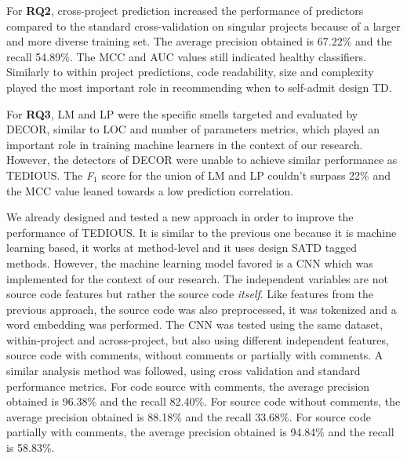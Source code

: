 For \textbf{RQ2}, cross-project prediction increased the performance of predictors compared to the standard cross-validation on singular projects because of a larger and more diverse training set. The average precision obtained is 67.22\% and the recall 54.89\%. The MCC and AUC values still indicated healthy classifiers. Similarly to within project predictions, code readability, size and complexity played the most important role in recommending when to self-admit design \ac{TD}. \par

For \textbf{RQ3}, \ac{LM} and \ac{LP} were the specific smells targeted and evaluated by \ac{DECOR}, similar to \ac{LOC} and number of parameters metrics, which played an important role in training machine learners in the context of our research. However, the detectors of \ac{DECOR} were unable to achieve similar performance as \ac{TEDIOUS}. The \emph{F$_{1}$} score for the union of \ac{LM} and \ac{LP} couldn't surpass 22\% and the \ac{MCC} value leaned towards a low prediction correlation. \par

We already designed and tested a new approach in order to improve the performance of \ac{TEDIOUS}. It is similar to the previous one because it is machine learning based, it works at method-level and it uses design \ac{SATD} tagged methods. However, the machine learning model favored is a \ac{CNN} which was implemented for the context of our research. The independent variables are not source code features but rather the source code \emph{itself}. Like features from the previous approach, the source code was also preprocessed, it was tokenized and a word embedding was performed. The \ac{CNN} was tested using the same dataset, within-project and across-project, but also using different independent features, source code with comments, without comments or partially with comments. A similar analysis method was followed, using cross validation and standard performance metrics. For code source with comments, the average precision obtained is 96.38\% and the recall 82.40\%. For source code without comments, the average precision obtained is 88.18\% and the recall 33.68\%. For source code partially with comments, the average precision obtained is 94.84\% and the recall is 58.83\%.


